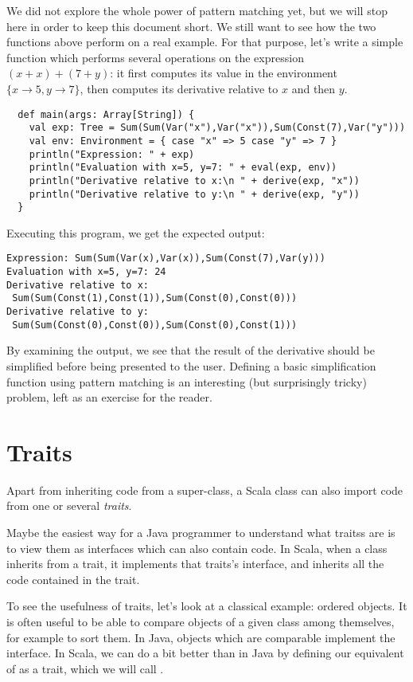 \documentclass[a4paper,12pt,twoside,titlepage]{article}
\newcommand{\langname}[1]{#1\xspace}
\newcommand{\Scala}{\langname{Scala}}
\newcommand{\Java}{\langname{Java}}
\begin{document}
We did not explore the whole power of pattern matching yet, but we
will stop here in order to keep this document short. We still want to
see how the two functions above perform on a real example. For that
purpose, let's write a simple  function which performs
several operations on the expression $(x+x)+(7+y)$: it first computes
its value in the environment $\{x\rightarrow 5, y\rightarrow 7\}$, then
computes its derivative relative to $x$ and then $y$.
\begin{lstlisting}
  def main(args: Array[String]) {
    val exp: Tree = Sum(Sum(Var("x"),Var("x")),Sum(Const(7),Var("y")))
    val env: Environment = { case "x" => 5 case "y" => 7 }
    println("Expression: " + exp)
    println("Evaluation with x=5, y=7: " + eval(exp, env))
    println("Derivative relative to x:\n " + derive(exp, "x"))
    println("Derivative relative to y:\n " + derive(exp, "y"))
  }
\end{lstlisting}
Executing this program, we get the expected output:
\begin{verbatim}
Expression: Sum(Sum(Var(x),Var(x)),Sum(Const(7),Var(y)))
Evaluation with x=5, y=7: 24
Derivative relative to x:
 Sum(Sum(Const(1),Const(1)),Sum(Const(0),Const(0)))
Derivative relative to y:
 Sum(Sum(Const(0),Const(0)),Sum(Const(0),Const(1)))
\end{verbatim}
By examining the output, we see that the result of the derivative
should be simplified before being presented to the user. Defining a
basic simplification function using pattern matching is an interesting
(but surprisingly tricky) problem, left as an exercise for the reader.

\section{Traits}\label{sec:traits}

Apart from inheriting code from a super-class, a \Scala class can also
import code from one or several \emph{traits}.

Maybe the easiest way for a \Java programmer to understand what traitss
are is to view them as interfaces which can also contain code. In
\Scala, when a class inherits from a trait, it implements that traits's
interface, and inherits all the code contained in the trait.

To see the usefulness of traits, let's look at a classical example:
ordered objects. It is often useful to be able to compare objects of a
given class among themselves, for example to sort them. In \Java,
objects which are comparable implement the 
interface. In \Scala, we can do a bit better than in \Java by defining
our equivalent of  as a trait, which we will call
.
\end{document}
